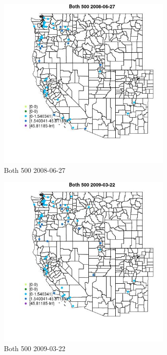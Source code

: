 \begin{figure} 
\centering  
\includegraphics[width=0.77\textwidth]{Code_Outputs/Report_ML_input_PM25_Step4_part_e_de_duplicated_aves_MapObsBoth_5002008-06-27.jpg} 
\caption{\label{fig:Report_ML_input_PM25_Step4_part_e_de_duplicated_avesMapObsBoth_5002008-06-27}Both 500 2008-06-27} 
\end{figure} 
 

\begin{figure} 
\centering  
\includegraphics[width=0.77\textwidth]{Code_Outputs/Report_ML_input_PM25_Step4_part_e_de_duplicated_aves_MapObsBoth_5002009-03-22.jpg} 
\caption{\label{fig:Report_ML_input_PM25_Step4_part_e_de_duplicated_avesMapObsBoth_5002009-03-22}Both 500 2009-03-22} 
\end{figure} 
 

